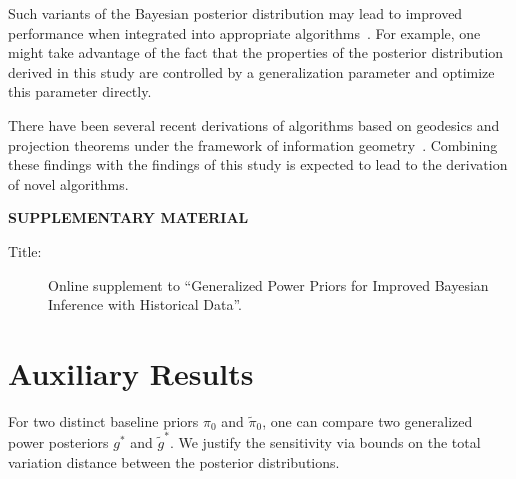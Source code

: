 \documentclass[12pt]{article}
\begin{document}
Such variants of the Bayesian posterior distribution may lead to improved performance when integrated into appropriate algorithms~\citep{erixon2003reliability,hill1968posterior,huang2023improved,kimura2024test,lewis1997estimating}.
For example, one might take advantage of the fact that the properties of the posterior distribution derived in this study are controlled by a generalization parameter and optimize this parameter directly.

There have been several recent derivations of algorithms based on geodesics and projection theorems under the framework of information geometry~\citep{akaho2004pca,carter2011information,sharp2022parameter}.
Combining these findings with the findings of this study is expected to lead to the derivation of novel algorithms.






\clearpage
\appendix
\begin{center}
{\large\bf SUPPLEMENTARY MATERIAL}
\end{center}

\begin{description}

\item[Title:] Online supplement to \enquote{Generalized Power Priors for Improved Bayesian Inference with Historical Data}.

\end{description}

\section{Auxiliary Results}
\label{sec:auxiliary_results}
For two distinct baseline priors $\pi_0$ and $\tilde{\pi}_0$, one can compare two generalized power posteriors $g^*$ and $\tilde{g}^*$.
We justify the sensitivity via bounds on the total variation distance between the posterior distributions.
\end{document}
